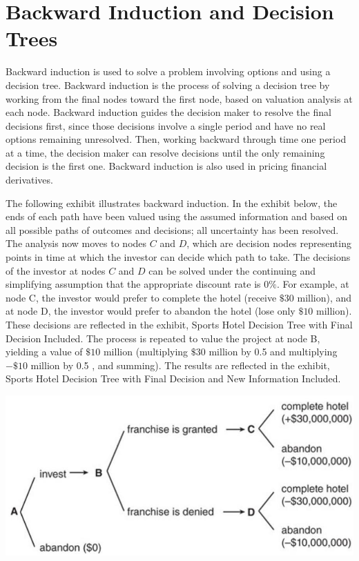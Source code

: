 \documentclass[11pt]{article}
\begin{document}
\section*{Backward Induction and Decision Trees}
Backward induction is used to solve a problem involving options and using a decision tree. Backward induction is the process of solving a decision tree by working from the final nodes toward the first node, based on valuation analysis at each node. Backward induction guides the decision maker to resolve the final decisions first, since those decisions involve a single period and have no real options remaining unresolved. Then, working backward through time one period at a time, the decision maker can resolve decisions until the only remaining decision is the first one. Backward induction is also used in pricing financial derivatives.

The following exhibit illustrates backward induction. In the exhibit below, the ends of each path have been valued using the assumed information and based on all possible paths of outcomes and decisions; all uncertainty has been resolved. The analysis now moves to nodes $C$ and $D$, which are decision nodes representing points in time at which the investor can decide which path to take. The decisions of the investor at nodes $C$ and $D$ can be solved under the continuing and simplifying assumption that the appropriate discount rate is $0 \%$. For example, at node C, the investor would prefer to complete the hotel (receive $\$ 30$ million), and at node D, the investor would prefer to abandon the hotel (lose only $\$ 10$ million). These decisions are reflected in the exhibit, Sports Hotel Decision Tree with Final Decision Included. The process is repeated to value the project at node B, yielding a value of $\$ 10$ million (multiplying $\$ 30$ million by 0.5 and multiplying $-\$ 10$ million by 0.5 , and summing). The results are reflected in the exhibit, Sports Hotel Decision Tree with Final Decision and New Information Included.

\begin{center}
\includegraphics[max width=\textwidth]{2024_04_11_73a6b5609218251c8b58g-3}
\end{center}
\end{document}
